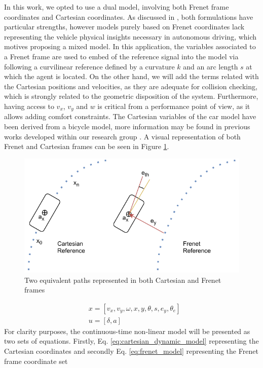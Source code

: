 \documentclass[letterpaper, 10 pt, conference]{ieeeconf}  %
\begin{document}
In this work, we opted to use a dual model, involving both Frenet frame coordinates and Cartesian coordinates. As discussed in \cite{Frenet2022}, both formulations have particular strengths, however models purely based on Frenet coordinates lack representing the vehicle physical insights necessary in autonomous driving, which motives proposing a mixed model. In this application, the variables associated to a Frenet frame are used to embed of the reference signal into the model via following a curvilinear reference defined by a curvature $k$ and an arc length $s$ at which the agent is located. On the other hand, we will add the terms related with the Cartesian positions and velocities, as they are adequate for collision checking, which is strongly related to the geometric disposition of the system. Furthermore, having access to $v_x$, $v_y$ and $w$ is critical from a performance point of view, as it allows adding comfort constraints. The Cartesian variables of the car model have been derived from a bicycle model, more information may be found in previous works developed within our research group \cite{alcala2020lpv}. A visual representation of both Frenet and Cartesian frames can be seen in Figure \ref{fig:FvC}. 
\begin{figure}
  \centering
  \includegraphics[width=0.75\columnwidth]{figs/FC.pdf}
    \caption{Two equivalent paths represented in both Cartesian and Frenet frames }
    \label{fig:FvC}
\end{figure}
\begin{equation}
    \label{eq:NL_model}
        \begin{aligned}
            &x = [v_x, v_y, \omega, x, y, \theta, s, e_y, \theta_e]\\ 
            &u = [\delta, a]
        \end{aligned}
\end{equation}
For clarity purposes, the continuous-time non-linear model will be presented as two sets of equations. Firstly, Eq. \eqref{eq:cartesian_dynamic_model} representing the Cartesian coordinates and secondly Eq. \eqref{eq:frenet_model} representing the Frenet frame coordinate set
\end{document}
